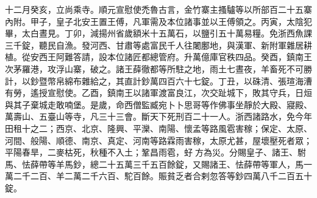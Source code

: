 \begin{pinyinscope}
 十二月癸亥，立尚乘寺。順元宣慰使禿魯古言，金竹寨主搔驢等以所部百二十五寨內附。甲子，皇子北安王置王傅，凡軍需及本位諸事並以王傅領之。丙寅，太陰犯畢，太白晝見。丁卯，減揚州省歲額米十五萬石，以鹽引五十萬易糧。免浙西魚課三千錠，聽民自漁。發河西、甘肅等處富民千人往闍鄽地，與漢軍、新附軍雜居耕植。從安西王阿難答請，設本位諸匠都總管府。升萬億庫官秩四品。癸酉，鎮南王次茅羅港，攻浮山寨，破之。諸王薛徹都等所駐之地，雨土七晝夜，羊畜死不可勝計，以鈔暨幣帛綿布雜給之，其直計鈔萬四百六十七錠。丁丑，以硃清、張瑄海漕有勞，遙授宣慰使。乙酉，鎮南王以諸軍渡富良江，次交趾城下，敗其守兵，日烜與其子棄城走敢喃堡。是歲，命西僧監臧宛卜卜思哥等作佛事坐靜於大殿、寢殿、萬壽山、五臺山等寺，凡三十三會。斷天下死刑百二十一人。浙西諸路水，免今年田租十之二；西京、北京、隆興、平灤、南陽、懷孟等路風雹害稼；保定、太原、河間、般陽、順德、南京、真定、河南等路霖雨害稼，太原尤甚，屋壞壓死者眾；平陽春旱，二麥枯死，秋種不入土；鞏昌雨雹，虸方為災。分賜皇子、諸王、駙馬、怯薛帶等羊馬鈔，總二十五萬三千五百餘錠，又賜諸王、怯薛帶等軍人，馬一萬二千二百、羊二萬二千六百、駝百餘。賑貧乏者合剌忽答等鈔四萬八千二百五十錠。



\end{pinyinscope}